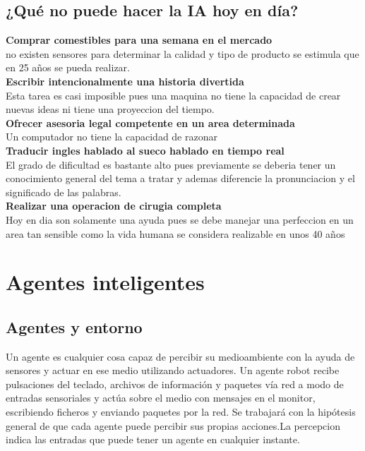 \documentclass[12pt,a4paper]{report}
\begin{document}
\subsection*{¿Qué no puede hacer la IA hoy en día?}
\textbf{Comprar comestibles para una semana en el mercado}\\no existen sensores para determinar la calidad y tipo de producto se estimula que en 25 años se pueda realizar.\\\textbf{Escribir intencionalmente una historia divertida}\\Esta tarea es casi imposible pues una maquina no tiene la capacidad de crear nuevas ideas ni tiene una proyeccion del tiempo.\\\textbf{Ofrecer asesoria legal competente en un area determinada}\\Un computador no tiene la capacidad de razonar\\\textbf{Traducir ingles hablado al sueco hablado en tiempo real}\\El grado de dificultad es bastante alto pues previamente se deberia tener un conocimiento general del tema a tratar y ademas diferencie la pronunciacion y el significado de las palabras.\\\textbf{Realizar una operacion de cirugia completa}\\Hoy en dia son solamente una ayuda pues se debe manejar una perfeccion en un area tan sensible como la vida humana se considera realizable en unos 40 años
\section{Agentes inteligentes}
\subsection*{Agentes y entorno} Un agente es cualquier cosa capaz de percibir su medioambiente con la ayuda de sensores y actuar en ese medio utilizando actuadores. Un agente robot recibe pulsaciones del teclado, archivos de información y paquetes vía red a modo de entradas sensoriales y actúa sobre el medio con mensajes en el monitor, escribiendo ficheros y enviando paquetes por la red. Se trabajará con la hipótesis general de que cada agente puede percibir sus propias acciones.La percepcion indica las entradas que puede tener un agente en cualquier instante.
\end{document}
